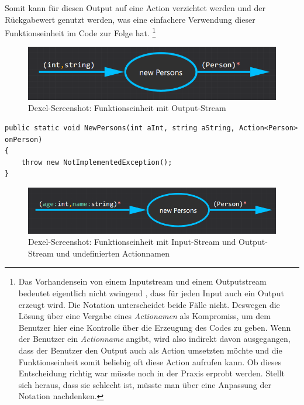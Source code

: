 	Somit kann für diesen Output auf eine Action verzichtet werden und der Rückgabewert genutzt werden, was eine einfachere Verwendung dieser Funktionseinheit im Code zur Folge hat.
	\footnote{	Das Vorhandensein von einem Inputstream und einem Outputstream bedeutet eigentlich nicht zwingend , dass für jeden Input auch ein	Output erzeugt wird. Die Notation unterscheidet beide Fälle nicht. Deswegen die Lösung über eine Vergabe eines \textit{Actionamen} als Kompromiss, um dem Benutzer hier eine Kontrolle über die Erzeugung des Codes zu geben. Wenn der Benutzer ein \textit{Actionname} angibt, wird also indirekt davon ausgegangen, dass der Benutzer den Output auch als Action umsetzten möchte und die Funktionseinheit somit beliebig oft diese Action aufrufen kann. Ob dieses Entscheidung richtig war müsste  noch in der Praxis erprobt werden. Stellt sich heraus,	dass sie schlecht ist, müsste man über eine Anpassung der Notation nachdenken.}
	
		
		\begin{figure}[H]
			\centering
			\includegraphics[width=.9\linewidth]{./img/roslyn_Stream.png} 
			\caption{Dexel-Screenshot: Funktionseinheit mit Output-Stream}
		\end{figure}
		
	

	
	
\begin{lstlisting}[caption=Mit Dexel generierter Code ]
public static void NewPersons(int aInt, string aString, Action<Person> onPerson)
{
	throw new NotImplementedException();
}
\end{lstlisting}
	
		
	\begin{figure}[H]
		\centering
		\includegraphics[width=.9\linewidth]{./img/roslyn_StreamStream.png} 
		\caption{Dexel-Screenshot: Funktionseinheit mit Input-Stream und Output-Stream und undefinierten Actionnamen}
	\end{figure}
			

